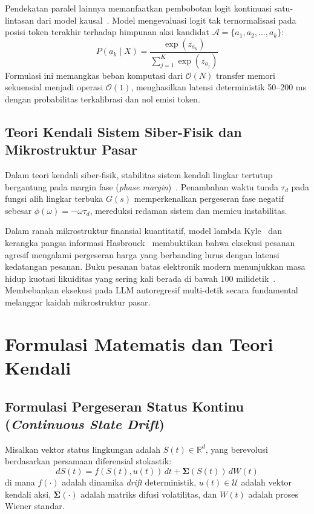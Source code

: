 \documentclass[journal,compsoc]{IEEEtran}
\begin{document}
Pendekatan paralel lainnya memanfaatkan pembobotan logit kontinuasi satu-lintasan dari model kausal~\cite{typesafe2025systemone}. Model mengevaluasi logit tak ternormalisasi pada posisi token terakhir terhadap himpunan aksi kandidat $\mathcal{A} = \{a_1, a_2, \dots, a_k\}$:
\begin{equation}
P(a_k \mid X) = \frac{\exp(z_{a_k})}{\sum_{j=1}^{K} \exp(z_{a_j})}
\end{equation}
Formulasi ini memangkas beban komputasi dari $\mathcal{O}(N)$ transfer memori sekuensial menjadi operasi $\mathcal{O}(1)$, menghasilkan latensi deterministik 50--200 ms dengan probabilitas terkalibrasi dan nol emisi token.

\subsection{Teori Kendali Sistem Siber-Fisik dan Mikrostruktur Pasar}
Dalam teori kendali siber-fisik, stabilitas sistem kendali lingkar tertutup bergantung pada margin fase (\textit{phase margin})~\cite{astrom2021feedback}. Penambahan waktu tunda $\tau_d$ pada fungsi alih lingkar terbuka $G(s)$ memperkenalkan pergeseran fase negatif sebesar $\phi(\omega) = -\omega \tau_d$, mereduksi redaman sistem dan memicu instabilitas.

Dalam ranah mikrostruktur finansial kuantitatif, model lambda Kyle~\cite{kyle1985continuous} dan kerangka pangsa informasi Hasbrouck~\cite{hasbrouck2007empirical} membuktikan bahwa eksekusi pesanan agresif mengalami pergeseran harga yang berbanding lurus dengan latensi kedatangan pesanan. Buku pesanan batas elektronik modern menunjukkan masa hidup kuotasi likuiditas yang sering kali berada di bawah 100 milidetik~\cite{ohara2015highfrequency}. Membebankan eksekusi pada LLM autoregresif multi-detik secara fundamental melanggar kaidah mikrostruktur pasar.

\section{Formulasi Matematis dan Teori Kendali}

\subsection{Formulasi Pergeseran Status Kontinu (\textit{Continuous State Drift})}
Misalkan vektor status lingkungan adalah $S(t) \in \mathbb{R}^d$, yang berevolusi berdasarkan persamaan diferensial stokastik:
\begin{equation}
dS(t) = f(S(t), u(t)) \, dt + \mathbf{\Sigma}(S(t)) \, dW(t)
\end{equation}
di mana $f(\cdot)$ adalah dinamika \textit{drift} deterministik, $u(t) \in \mathcal{U}$ adalah vektor kendali aksi, $\mathbf{\Sigma}(\cdot)$ adalah matriks difusi volatilitas, dan $W(t)$ adalah proses Wiener standar.
\end{document}

